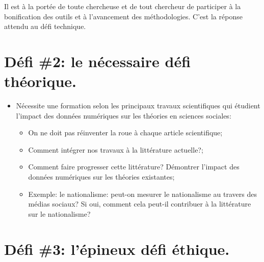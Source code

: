 \documentclass[
  letterpaper,
  DIV=11,
  numbers=noendperiod]{scrreprt}
\providecommand{\tightlist}{%
  \setlength{\itemsep}{0pt}\setlength{\parskip}{0pt}}\usepackage{longtable,booktabs,array}
\begin{document}
Il est à la portée de toute chercheuse et de tout chercheur de
participer à la bonification des outils et à l'avancement des
méthodologies. C'est la réponse attendu au défi technique.

\hypertarget{duxe9fi-2-le-nuxe9cessaire-duxe9fi-thuxe9orique.}{%
\section{Défi \#2: le nécessaire défi
théorique.}\label{duxe9fi-2-le-nuxe9cessaire-duxe9fi-thuxe9orique.}}

\begin{itemize}
\tightlist
\item
  Nécessite une formation selon les principaux travaux scientifiques qui
  étudient l'impact des données numériques sur les théories en sciences
  sociales:

  \begin{itemize}
  \tightlist
  \item
    On ne doit pas réinventer la roue à chaque article scientifique;
  \item
    Comment intégrer nos travaux à la littérature actuelle?;
  \item
    Comment faire progresser cette littérature? Démontrer l'impact des
    données numériques sur les théories existantes;
  \item
    Exemple: le nationalisme: peut-on mesurer le nationalisme au travers
    des médias sociaux? Si oui, comment cela peut-il contribuer à la
    littérature sur le nationalisme?
  \end{itemize}
\end{itemize}

\hypertarget{duxe9fi-3-luxe9pineux-duxe9fi-uxe9thique.}{%
\section{Défi \#3: l'épineux défi
éthique.}\label{duxe9fi-3-luxe9pineux-duxe9fi-uxe9thique.}}
\end{document}
